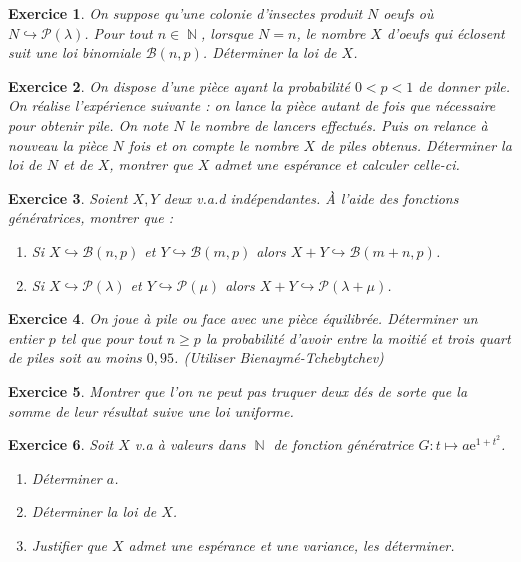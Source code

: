 \documentclass[12pt,a4paper,landscape]{article}
\DeclareMathOperator{\N}{\mathbb{N}}
\newtheorem{Exo}{Exercice}
\begin{document}
 \begin{Exo}
 	On suppose qu’une colonie d’insectes produit $N$ oeufs où $N\hookrightarrow\mathcal{P}(\lambda)$. Pour tout $n\in\N$, lorsque $N=n$, le nombre $X$ d’oeufs qui éclosent suit une loi binomiale $\mathcal{B}(n,p)$. Déterminer la loi de $X$.
 \end{Exo}
 
 
 
\begin{Exo}
	On dispose d’une pièce ayant la probabilité $0<p<1$ de donner pile.
On  réalise l’expérience suivante : on lance la pièce autant de fois que nécessaire pour obtenir pile. On note $N$ le nombre de lancers effectués. Puis on relance à nouveau la pièce $N$ fois et on compte le nombre $X$ de piles obtenus. Déterminer la loi de $N$ et de $X$, montrer que $X$ admet une espérance et calculer celle-ci.
\end{Exo}


\begin{Exo}
	Soient $X,Y$ deux v.a.d indépendantes. À l’aide des fonctions génératrices, montrer que :
\begin{enumerate}
	\item
	Si $X\hookrightarrow \mathcal{B}(n,p)$ et $Y\hookrightarrow \mathcal{B}(m,p)$ alors  $X+Y\hookrightarrow \mathcal{B}(m+n,p)$.
	\item
	Si $X\hookrightarrow \mathcal{P}(\lambda)$ et $Y\hookrightarrow \mathcal{P}(\mu)$ alors  $X+Y\hookrightarrow \mathcal{P}(\lambda+\mu)$.
\end{enumerate}
\end{Exo}


\begin{Exo}
	On joue à pile ou face avec une pièce équilibrée.  Déterminer un entier $p$ tel
que pour tout $n\geqslant p$ la probabilité d'avoir entre la moitié et trois quart de piles soit au moins $0,95$. (Utiliser Bienaymé-Tchebytchev)
\end{Exo}



\begin{Exo}
	Montrer que l'on ne peut pas truquer deux dés de sorte que la somme de leur résultat suive une loi uniforme.
\end{Exo}


\begin{Exo}
	Soit $X$ v.a à valeurs dans $\N$ de fonction génératrice $G:t\mapsto a\mathrm{e}^{1+t^2}$.
\begin{enumerate}
	\item
	Déterminer $a$.
	\item
	Déterminer la loi de $X$.
	\item Justifier que $X$ admet une espérance et une variance, les déterminer.
\end{enumerate}
\end{Exo}
\end{document}
